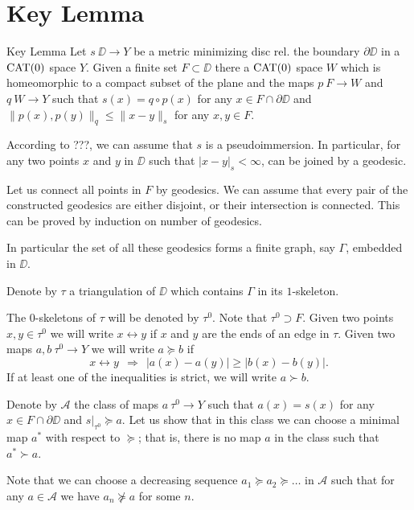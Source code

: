 \documentclass[a4paper,10pt]{amsart}
\begin{document}
\section{Key Lemma}


\begin{thm}{Key Lemma}\label{lem:key}
Let $s\:\DD\to Y$ 
be a metric minimizing disc rel. the boundary $\partial \DD$
in a $\mathop{\rm CAT}\nolimits(0)$ space $Y$.
Given a finite set $F\subset \DD$
there a $\mathop{\rm CAT}\nolimits(0)$ space $W$ which is homeomorphic to a compact subset of the plane
and the maps $p\:F\to W$ and $q\:W\to Y$ such that
$s(x)=q\circ p(x)$ for any $x\in F\cap \partial \DD$
and $\|p(x),p(y)\|_q\le \|x-y\|_s$ for any $x,y\in F$.
\end{thm}

According to ???, we can assume that $s$ is a pseudoimmersion.
In particular, 
for any two points $x$ and $y$ in $\DD$ such that $|x-y|_s<\infty$,
can be joined by a geodesic.

Let us connect all points in $F$ by geodesics.
We can assume that 
every pair of the constructed geodesics 
are either disjoint, or their intersection is connected.
This can be proved by induction on number of geodesics.


In particular the set of all these geodesics forms a finite graph, say $\Gamma$,
embedded in $\DD$. 

Denote by $\tau$ a triangulation of $\DD$ which contains $\Gamma$ in its $1$-skeleton.

The $0$-skeletons of $\tau$ will be denoted by $\tau^0$.
Note that $\tau^0\supset F$. 
Given two points $x,y\in \tau^0$ we will write 
$x \leftrightarrow y$ if $x$ and $y$ are the ends of an edge in $\tau$. 
Given two maps $a,b\:\tau^0\to Y$ we will write
$a\succcurlyeq b$ if 
\[x\leftrightarrow y\ \ \Rightarrow\ \ |a(x)-a(y)|\ge |b(x)-b(y)|.\]
If at least one of the inequalities is strict, we will write $a\succ b$.

Denote by $\mathcal{A}$ the class of maps $a\:\tau^0\to Y$ such that
$a(x)=s(x)$ for any $x\in F\cap\partial \DD$ and $s|_{\tau^0}\succcurlyeq a$.
Let us show that in this class we can choose a minimal map $a^*$ with respect to $\succcurlyeq$;
that is, there is no map $a$ in the class such that  $a^*\succ a$.

Note that we can choose a decreasing sequence 
$a_1
\succcurlyeq
a_2
\succcurlyeq
\dots $
in $\mathcal{A}$ such that for any $a\in \mathcal{A}$
we have $a_n\not\succcurlyeq a$ for some $n$.
\end{document}
